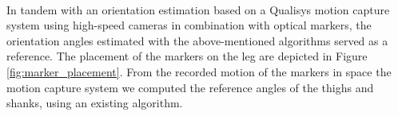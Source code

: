 \begin{itemize}


  \end{itemize}
  


In tandem with an orientation estimation based on a Qualisys\textsuperscript{\textregistered} motion capture system using high-speed cameras in combination with optical markers, the orientation angles estimated with the above-mentioned algorithms served as a reference. The placement of the markers on the leg are depicted in Figure \ref{fig:marker_placement}. From the recorded motion of the markers in space the motion capture system we computed the reference angles of the thighs and shanks, using an existing algorithm.


